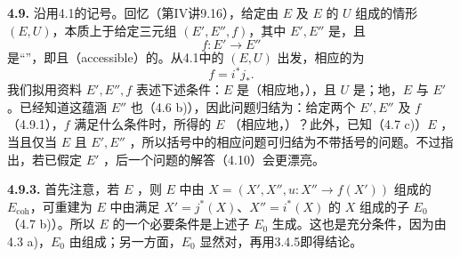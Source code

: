 \textbf{4.9.} 沿用4.1的记号。回忆（第IV讲9.16），给定由 $E$ 及 $E$ 的 $U$ 组成的情形 $(E,U)$，本质上于给定三元组 $(E',E'',f)$，其中 $E',E''$ 是，且
\[
f:E'\longrightarrow E''\tag{4.9.1}
\]
是“”，即且（accessible）的。从4.1中的 $(E,U)$ 出发，相应的为
\[
f=i^*j_* .\tag{4.9.2}
\]
我们拟用资料 $E',E'',f$ 表述下述条件：$E$ 是（相应地，），且 $U$ 是；地，$E$ 与 $E'$ 。已经知道这蕴涵 $E''$ 也（4.6 b)），因此问题归结为：给定两个 $E',E''$ 及 $f$（4.9.1），$f$ 满足什么条件时，所得的 $E$ （相应地，）？此外，已知（4.7 c)）$E$ ，当且仅当 $E$ 且 $E',E''$ ，所以括号中的相应问题可归结为不带括号的问题。不过指出，若已假定 $E'$ ，后一个问题的解答（4.10）会更漂亮。

\textbf{4.9.3.} 首先注意，若 $E$ ，则 $E$ 中由 $X=(X',X'',u:X''\to f(X'))$ 组成的 $E_{\mathrm{coh}}$，可重建为 $E$ 中由满足 $X'=j^*(X)$、$X''=i^*(X)$ 的 $X$ 组成的子 $E_0$（4.7 b)）。所以 $E$ 的一个必要条件是上述子 $E_0$ 生成。这也是充分条件，因为由4.3 a)，$E_0$ 由组成；另一方面，$E_0$ 显然对，再用3.4.5即得结论。

